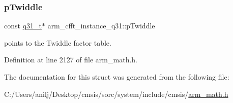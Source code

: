 \subsubsection{\texorpdfstring{p\+Twiddle}{pTwiddle}}
{\footnotesize\ttfamily const \hyperlink{arm__math_8h_adc89a3547f5324b7b3b95adec3806bc0}{q31\+\_\+t}$\ast$ arm\+\_\+cfft\+\_\+instance\+\_\+q31\+::p\+Twiddle}

points to the Twiddle factor table. 

Definition at line 2127 of file arm\+\_\+math.\+h.



The documentation for this struct was generated from the following file\+:\begin{DoxyCompactItemize}
\item 
C\+:/\+Users/anilj/\+Desktop/cmsis/sorc/system/include/cmsis/\hyperlink{arm__math_8h}{arm\+\_\+math.\+h}\end{DoxyCompactItemize}
